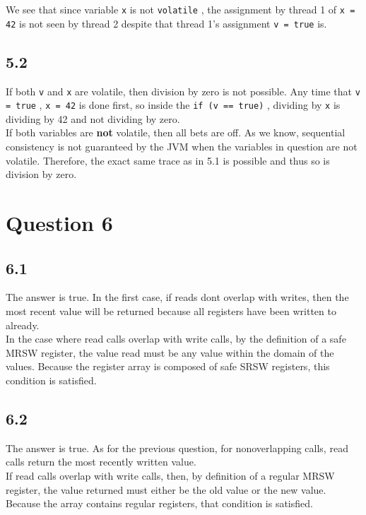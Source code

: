 \documentclass[11pt, letterpaper]{article}
\newcommand{\code}[1] { \texttt{#1} }
\begin{document}
We see that since variable \code{x} is not \code{volatile}, the assignment by thread 1 of \code{x = 42} is not seen by thread 2 despite that thread 1's assignment \code{v = true} is.

\subsection*{5.2}
\label{sub:5_2}

If both \code{v} and \code{x} are volatile, then division by zero is not possible. Any time that \code{v = true}, \code{x = 42} is done first, so inside the \code{if (v == true)}, dividing by \code{x} is dividing by 42 and not dividing by zero.\\

If both variables are \textbf{not} volatile, then all bets are off. As we know, sequential consistency is not guaranteed by the JVM when the variables in question are not volatile. Therefore, the exact same trace as in 5.1 is possible and thus so is division by zero.

\newpage
\section*{Question 6}
\label{sec:question_6}

\subsection*{6.1}
\label{sub:6_1}

The answer is true. In the first case, if reads dont overlap with writes, then the most recent value will be returned because all registers have been written to already.\\

In the case where read calls overlap with write calls, by the definition of a safe MRSW register, the value read must be any value within the domain of the values. Because the register array is composed of safe SRSW registers, this condition is satisfied.

\subsection*{6.2}
\label{sub:6_2}

The answer is true. As for the previous question, for nonoverlapping calls, read calls return the most recently written value.\\

If read calls overlap with write calls, then, by definition of a regular MRSW register, the value returned must either be the old value or the new value. Because the array contains regular registers, that condition is satisfied.
\end{document}
